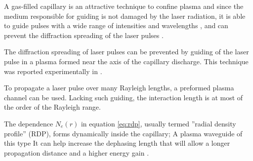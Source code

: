 \documentclass[justified,nofonts,nobib,openany]{tufte-book}
\begin{document}
A gas-filled capillary is an attractive technique to confine plasma \cite{Bobrova2002SimulationsWaveguide,Spence2001InvestigationWaveguide} and since the medium responsible for guiding is not damaged by the laser radiation, it is able to guide pulses with a wide range of intensities and wavelengths \cite{Dorchies1999MonomodeTubes}, and can prevent the diffraction spreading of the laser pulses \cite{Sprangle1990NonlinearPlasmas,Bulanov1994ShortChannel}.

The diffraction spreading of laser pulses can be prevented by guiding of the laser pulse in a plasma formed near the axis of the capillary discharge. This technique was reported experimentally in \cite{Ehrlich1996GuidingExperiments}.

To propagate a laser pulse over many Rayleigh lengths, a preformed plasma channel can be used.  Lacking such guiding, the interaction length is at most of the order of the Rayleigh range.

The dependence $N_e\left(r\right)$ in equation \ref{eq:rdp}, usually termed ”radial density profile” (RDP), forms dynamically inside the capillary; A plasma waveguide of this type It can help increase the dephasing length that will allow a longer propagation distance and a higher energy gain \cite{Sprangle2000StableAcceleration}.
\end{document}

